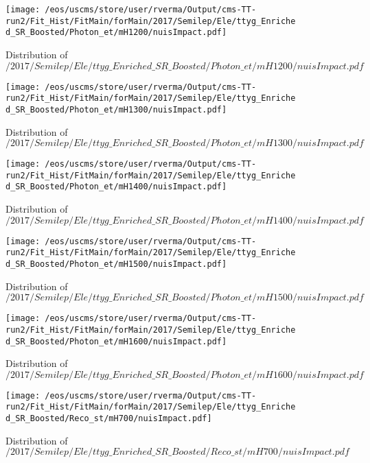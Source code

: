 \begin{figure}
\centering
\texttt{[image: /eos/uscms/store/user/rverma/Output/cms-TT-run2/Fit\_Hist/FitMain/forMain/2017/Semilep/Ele/ttyg\_Enriched\_SR\_Boosted/Photon\_et/mH1200/nuisImpact.pdf]}
\caption{Distribution of $/2017/Semilep/Ele/ttyg\_Enriched\_SR\_Boosted/Photon\_et/mH1200/nuisImpact.pdf$}
\end{figure}

\begin{figure}
\centering
\texttt{[image: /eos/uscms/store/user/rverma/Output/cms-TT-run2/Fit\_Hist/FitMain/forMain/2017/Semilep/Ele/ttyg\_Enriched\_SR\_Boosted/Photon\_et/mH1300/nuisImpact.pdf]}
\caption{Distribution of $/2017/Semilep/Ele/ttyg\_Enriched\_SR\_Boosted/Photon\_et/mH1300/nuisImpact.pdf$}
\end{figure}

\begin{figure}
\centering
\texttt{[image: /eos/uscms/store/user/rverma/Output/cms-TT-run2/Fit\_Hist/FitMain/forMain/2017/Semilep/Ele/ttyg\_Enriched\_SR\_Boosted/Photon\_et/mH1400/nuisImpact.pdf]}
\caption{Distribution of $/2017/Semilep/Ele/ttyg\_Enriched\_SR\_Boosted/Photon\_et/mH1400/nuisImpact.pdf$}
\end{figure}

\begin{figure}
\centering
\texttt{[image: /eos/uscms/store/user/rverma/Output/cms-TT-run2/Fit\_Hist/FitMain/forMain/2017/Semilep/Ele/ttyg\_Enriched\_SR\_Boosted/Photon\_et/mH1500/nuisImpact.pdf]}
\caption{Distribution of $/2017/Semilep/Ele/ttyg\_Enriched\_SR\_Boosted/Photon\_et/mH1500/nuisImpact.pdf$}
\end{figure}

\begin{figure}
\centering
\texttt{[image: /eos/uscms/store/user/rverma/Output/cms-TT-run2/Fit\_Hist/FitMain/forMain/2017/Semilep/Ele/ttyg\_Enriched\_SR\_Boosted/Photon\_et/mH1600/nuisImpact.pdf]}
\caption{Distribution of $/2017/Semilep/Ele/ttyg\_Enriched\_SR\_Boosted/Photon\_et/mH1600/nuisImpact.pdf$}
\end{figure}

\begin{figure}
\centering
\texttt{[image: /eos/uscms/store/user/rverma/Output/cms-TT-run2/Fit\_Hist/FitMain/forMain/2017/Semilep/Ele/ttyg\_Enriched\_SR\_Boosted/Reco\_st/mH700/nuisImpact.pdf]}
\caption{Distribution of $/2017/Semilep/Ele/ttyg\_Enriched\_SR\_Boosted/Reco\_st/mH700/nuisImpact.pdf$}
\end{figure}

